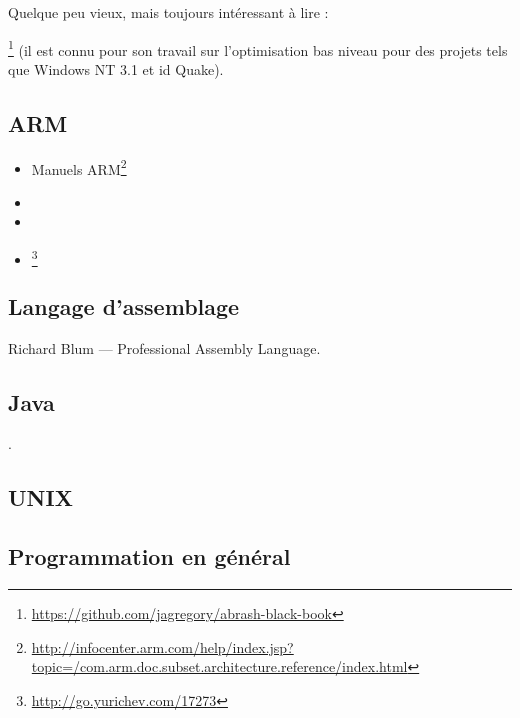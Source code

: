 Quelque peu vieux, mais toujours intéressant à lire :

\MAbrash\footnote{\AlsoAvailableAs \url{https://github.com/jagregory/abrash-black-book}}
(il est connu pour son travail sur l'optimisation bas niveau pour des projets tels que Windows NT 3.1 et id Quake).

\subsection{ARM}

\begin{itemize}
\item Manuels ARM\footnote{\AlsoAvailableAs \url{http://infocenter.arm.com/help/index.jsp?topic=/com.arm.doc.subset.architecture.reference/index.html}}

\item \ARMSevenRef

\item \ARMSixFourRefURL

\item \ARMCookBook\footnote{\AlsoAvailableAs \url{http://go.yurichev.com/17273}}
\end{itemize}

\subsection{Langage d'assemblage}

Richard Blum --- Professional Assembly Language.

\subsection{Java}

\JavaBook.

\subsection{UNIX}

\TAOUP

\subsection{Programmation en général}

